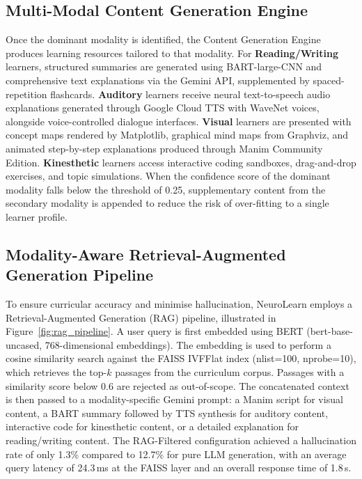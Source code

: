 \subsection{Multi-Modal Content Generation Engine}

Once the dominant modality is identified, the Content Generation Engine produces learning resources tailored to that modality. For \textbf{Reading/Writing} learners, structured summaries are generated using BART-large-CNN and comprehensive text explanations via the Gemini API, supplemented by spaced-repetition flashcards. \textbf{Auditory} learners receive neural text-to-speech audio explanations generated through Google Cloud TTS with WaveNet voices, alongside voice-controlled dialogue interfaces. \textbf{Visual} learners are presented with concept maps rendered by Matplotlib, graphical mind maps from Graphviz, and animated step-by-step explanations produced through Manim Community Edition. \textbf{Kinesthetic} learners access interactive coding sandboxes, drag-and-drop exercises, and topic simulations. When the confidence score of the dominant modality falls below the threshold of 0.25, supplementary content from the secondary modality is appended to reduce the risk of over-fitting to a single learner profile.

\subsection{Modality-Aware Retrieval-Augmented Generation Pipeline}

To ensure curricular accuracy and minimise hallucination, NeuroLearn employs a Retrieval-Augmented Generation (RAG) pipeline, illustrated in Figure~\ref{fig:rag_pipeline}. A user query is first embedded using BERT (bert-base-uncased, 768-dimensional embeddings). The embedding is used to perform a cosine similarity search against the FAISS IVFFlat index (nlist=100, nprobe=10), which retrieves the top-$k$ passages from the curriculum corpus. Passages with a similarity score below 0.6 are rejected as out-of-scope. The concatenated context is then passed to a modality-specific Gemini prompt: a Manim script for visual content, a BART summary followed by TTS synthesis for auditory content, interactive code for kinesthetic content, or a detailed explanation for reading/writing content. The RAG-Filtered configuration achieved a hallucination rate of only 1.3\% compared to 12.7\% for pure LLM generation, with an average query latency of 24.3\,ms at the FAISS layer and an overall response time of 1.8\,s.

